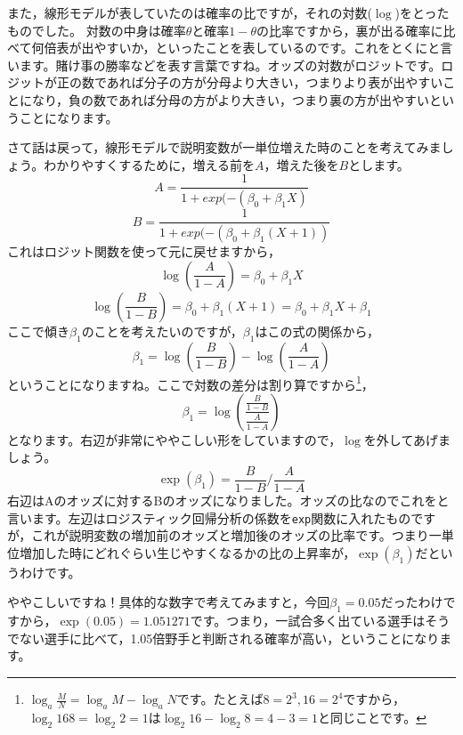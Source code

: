 \documentclass{ltjsbook}
\begin{document}
また，線形モデルが表していたのは確率の比ですが，それの対数($\log$)をとったものでした。
対数の中身は確率$\theta$と確率$1-\theta$の比率ですから，裏が出る確率に比べて何倍表が出やすいか，といったことを表しているのです。これをとくにと言います。賭け事の勝率などを表す言葉ですね。オッズの対数がロジットです。ロジットが正の数であれば分子の方が分母より大きい，つまりより表が出やすいことになり，負の数であれば分母の方がより大きい，つまり裏の方が出やすいということになります。

さて話は戻って，線形モデルで説明変数が一単位増えた時のことを考えてみましょう。わかりやすくするために，増える前を$A$，増えた後を$B$とします。
\[ A = \frac{1}{1+exp(-(\beta_0 + \beta_1X)} \]
\[ B = \frac{1}{1+exp(-(\beta_0 + \beta_1(X+1))} \]
これはロジット関数を使って元に戻せますから，
\[ \log\left( \frac{A}{1-A} \right) = \beta_0 + \beta_1 X \]
\[ \log\left(\frac{B}{1-B} \right)= \beta_0 + \beta_1 (X+1)  = \beta_0 + \beta_1X + \beta_1\]
ここで傾き$\beta_1$のことを考えたいのですが，$\beta_1$はこの式の関係から，
\[ \beta_1 = \log\left(\frac{B}{1-B} \right) - \log\left( \frac{A}{1-A} \right) \]
ということになりますね。ここで対数の差分は割り算ですから\footnote{$\log_a \frac{M}{N} = \log_a M-\log_a N$です。たとえば$8=2^3,16=2^4$ですから，$\log_2{16}{8} = \log_2 2 = 1$は$\log_2 16 - \log_2 8 = 4 - 3 = 1$と同じことです。}，
\[ \beta_1 = \log\left( \frac{ \frac{B}{1-B} }{ \frac{A}{1-A} } \right) \]
となります。右辺が非常にややこしい形をしていますので，$\log$を外してあげましょう。
\[ \exp(\beta_1) =  \frac{B}{1-B}  \Big/  \frac{A}{1-A}  \]
右辺はAのオッズに対するBのオッズになりました。オッズの比なのでこれをと言います。左辺はロジスティック回帰分析の係数を\verb|exp|関数に入れたものですが，これが説明変数の増加前のオッズと増加後のオッズの比率です。つまり一単位増加した時にどれぐらい生じやすくなるかの比の上昇率が，$\exp(\beta_1)$だというわけです。

ややこしいですね！具体的な数字で考えてみますと，今回$\beta_1=0.05$だったわけですから，$\exp(0.05)=1.051271$です。つまり，一試合多く出ている選手はそうでない選手に比べて，1.05倍野手と判断される確率が高い，ということになります。
\end{document}
